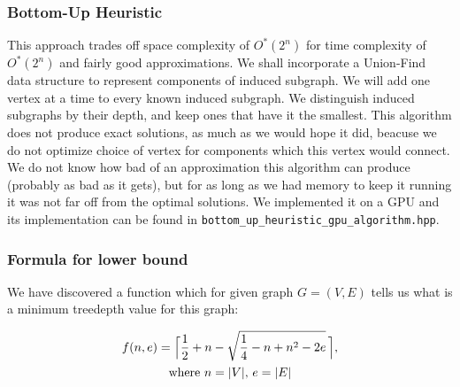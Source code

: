 \subsubsection{Bottom-Up Heuristic}
This approach trades off space complexity of $O^*\left(2^n\right)$ for time complexity of  $O^*\left(2^n\right)$ and fairly good approximations. We shall incorporate a Union-Find data structure to represent components of induced subgraph. We will add one vertex at a time to every known induced subgraph. We distinguish induced subgraphs by their depth, and keep ones that have it the smallest. This algorithm does not produce exact solutions, as much as we would hope it did, beacuse we do not optimize choice of vertex for components which this vertex would connect. We do not know how bad of an approximation this algorithm can produce (probably as bad as it gets), but for as long as we had memory to keep it running it was not far off from the optimal solutions. We implemented it on a GPU and its implementation can be found in \texttt{bottom\_up\_heuristic\_gpu\_algorithm.hpp}.
\subsubsection{Formula for lower bound}
We have discovered a function which for given graph $G=(V,E)$ tells us what is a minimum treedepth value for this graph:

\begin{gather*}
f(n,e)=\Bigl\lceil\frac{1}{2}+n-\sqrt{\frac{1}{4}-n+n^2-2e}   \,\Bigr\rceil, \\
\text{where $n = |V|$, $e = |E|$}
\end{gather*}


